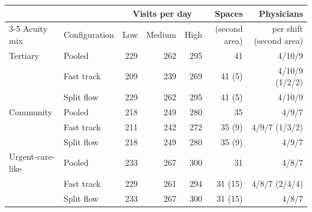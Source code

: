 \begin{tabular}{llrrrrr}
\toprule
 & & \multicolumn{3}{c}{Visits per day} & Spaces & Physicians \\
\cmidrule(lr){3-5}
Acuity mix & Configuration & Low & Medium & High & (second area) & per shift (second area) \\
\midrule
Tertiary & Pooled & 229 & 262 & 295 & 41 & 4/10/9 \\
 & Fast track & 209 & 239 & 269 & 41 (5) & 4/10/9 (1/2/2) \\
 & Split flow & 229 & 262 & 295 & 41 (5) & 4/10/9 \\
\addlinespace
Community & Pooled & 218 & 249 & 280 & 35 & 4/9/7 \\
 & Fast track & 211 & 242 & 272 & 35 (9) & 4/9/7 (1/3/2) \\
 & Split flow & 218 & 249 & 280 & 35 (9) & 4/9/7 \\
\addlinespace
Urgent-care-like & Pooled & 233 & 267 & 300 & 31 & 4/8/7 \\
 & Fast track & 229 & 261 & 294 & 31 (15) & 4/8/7 (2/4/4) \\
 & Split flow & 233 & 267 & 300 & 31 (15) & 4/8/7 \\
\bottomrule
\end{tabular}